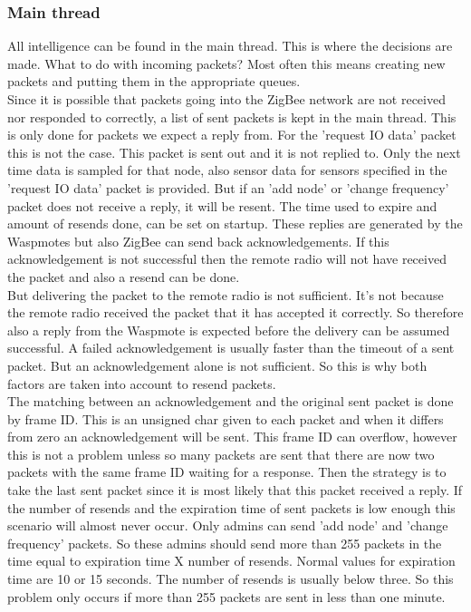 \subsubsection{Main thread}
All intelligence can be found in the main thread. This is where the decisions are made. What to do with incoming packets? Most often this means creating new packets and putting them in the appropriate queues.\\
Since it is possible that packets going into the ZigBee network are not received nor responded to correctly, a list of sent packets is kept in the main thread. This is only done for packets we expect a reply from. For the 'request IO data' packet this is not the case. This packet is sent out and it is not replied to. Only the next time data is sampled for that node, also sensor data for sensors specified in the 'request IO data' packet is provided. But if an 'add node' or 'change frequency' packet does not receive a reply, it will be resent. The time used to expire and amount of resends done, can be set on startup. These replies are generated by the Waspmotes but also ZigBee can send back acknowledgements. If this acknowledgement is not successful then the remote radio will not have received the packet and also a resend can be done.\\
But delivering the packet to the remote radio is not sufficient. It's not because the remote radio received the packet that it has accepted it correctly. So therefore also a reply from the Waspmote is expected before the delivery can be assumed successful. A failed acknowledgement is usually faster than the timeout of a sent packet. But an acknowledgement alone is not sufficient. So this is why both factors are taken into account to resend packets.\\
The matching between an acknowledgement and the original sent packet is done by frame ID. This is an unsigned char given to each packet and when it differs from zero an acknowledgement will be sent. This frame ID can overflow, however this is not a problem unless so many packets are sent that there are now two packets with the same frame ID waiting for a response. Then the strategy is to take the last sent packet since it is most likely that this packet received a reply. If the number of resends and the expiration time of sent packets is low enough this scenario will almost never occur. Only admins can send 'add node' and 'change frequency' packets. So these admins should send more than 255 packets in the time equal to expiration time X number of resends. Normal values for expiration time are 10 or 15 seconds. The number of resends is usually below three. So this problem only occurs if more than 255 packets are sent in less than one minute.\\
